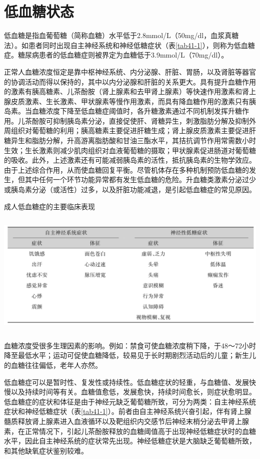 \chapter{低血糖状态}

低血糖是指血葡萄糖（简称血糖）水平低于2.8mmol/L（50mg/dl，血浆真糖法）。如患者同时出现自主神经系统和神经低糖症状（表\ref{tab41-1}），则称为低血糖症。糖尿病患者的低血糖症则被界定为血糖低于3.9mmol/L（70mg/dl）。

正常人血糖浓度恒定是靠中枢神经系统、内分泌腺、肝脏、胃肠，以及肾脏等器官的协调活动而得以保持的，其中以内分泌腺和肝脏的关系更大。具有提升血糖作用的激素有胰高糖素、儿茶酚胺（肾上腺素和去甲肾上腺素）等快速作用激素和肾上腺皮质激素、生长激素、甲状腺素等慢作用激素，而具有降血糖作用的激素只有胰岛素。当血糖浓度下降至低血糖症阈值时，各升糖激素通过不同机制发挥升糖作用。儿茶酚胺可抑制胰岛素分泌，直接促使肝、肾糖异生，刺激脂肪分解及抑制外周组织对葡萄糖的利用；胰高糖素主要促进肝糖生成；肾上腺皮质激素主要促进肝糖异生和脂肪分解，升高游离脂肪酸和甘油三酯水平，其拮抗调节作用常需数小时生效；生长激素则减少肌肉组织对血液葡萄糖的摄取；甲状腺素促进肠道对葡萄糖的吸收。此外，上述激素还有可能减弱胰岛素的活性，抵抗胰岛素的生物学效应。由于上述综合作用，从而使血糖回复平衡。尽管机体存在多种机制预防低血糖的发生，但其中任何一个环节功能异常都有发生低血糖的危险。升血糖类激素分泌过少或胰岛素分泌（或活性）过多，以及肝脏功能减退，是引起低血糖症的常见原因。

\begin{table}[htbp]
\centering
\caption{成人低血糖症的主要临床表现}
\label{tab41-1}
\includegraphics[width=5.95833in,height=2.35417in]{./images/Image00250.jpg}
\end{table}

血糖浓度受很多生理因素的影响。例如：禁食可使血糖浓度稍下降，于48～72小时降至最低水平；运动可促使血糖降低，较易见于长时期剧烈活动后的儿童；新生儿的血糖往往偏低，老年人亦然。

低血糖症可以是暂时性、复发性或持续性。低血糖症状的轻重，与血糖值、发展快慢以及持续时间等有关。血糖值愈低，发展愈快，持续时间愈长，则症状愈明显。低血糖症的症状和体征是由于神经元缺乏葡萄糖所致，可分为两类：自主神经系统症状和神经低糖症状（表\ref{tab41-1}）。前者由自主神经系统兴奋引起，伴有肾上腺髓质释放肾上腺素进入血液循环以及靶组织内交感节后神经末梢分泌去甲肾上腺素，在正常情况下，引起儿茶酚胺释放的血糖阈值高于出现神经低糖症状时的血糖水平，因此自主神经系统的症状常先出现。神经低糖症状是大脑缺乏葡萄糖所致，和其他缺氧症状鉴别较难。

